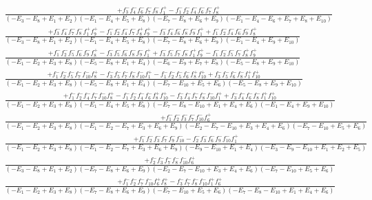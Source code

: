 \documentclass{article}
\begin{document}
\[\begin{array}{rcl}
\frac{+f_{3}^{-}f_{4}^{-}f_{6}^{-}f_{7}^{-}f_{8}^{-}f_{1}^{+}-f_{1}^{-}f_{2}^{-}f_{4}^{-}f_{6}^{-}f_{7}^{-}f_{8}^{+}}{(-E_{3}-E_{8}+E_{1}+E_{2})(-E_{1}-E_{4}+E_{5}+E_{8})(-E_{7}-E_{8}+E_{6}+E_{9})(-E_{1}-E_{4}-E_{6}+E_{7}+E_{8}+E_{10})}\\
\frac{+f_{3}^{-}f_{4}^{-}f_{7}^{-}f_{8}^{-}f_{1}^{+}f_{9}^{+}-f_{1}^{-}f_{2}^{-}f_{4}^{-}f_{7}^{-}f_{8}^{+}f_{9}^{+}-f_{3}^{-}f_{4}^{-}f_{6}^{-}f_{8}^{-}f_{9}^{-}f_{1}^{+}+f_{1}^{-}f_{2}^{-}f_{4}^{-}f_{6}^{-}f_{9}^{-}f_{8}^{+}}{(-E_{3}-E_{8}+E_{1}+E_{2})(-E_{1}-E_{4}+E_{5}+E_{8})(-E_{7}-E_{8}+E_{6}+E_{9})(-E_{1}-E_{4}+E_{9}+E_{10})}\\
\frac{+f_{1}^{-}f_{2}^{-}f_{5}^{-}f_{6}^{-}f_{9}^{-}f_{8}^{+}-f_{3}^{-}f_{5}^{-}f_{6}^{-}f_{8}^{-}f_{9}^{-}f_{1}^{+}+f_{3}^{-}f_{5}^{-}f_{7}^{-}f_{8}^{-}f_{1}^{+}f_{9}^{+}-f_{1}^{-}f_{2}^{-}f_{5}^{-}f_{7}^{-}f_{8}^{+}f_{9}^{+}}{(-E_{1}-E_{2}+E_{3}+E_{8})(-E_{5}-E_{8}+E_{1}+E_{4})(-E_{6}-E_{9}+E_{7}+E_{8})(-E_{5}-E_{8}+E_{9}+E_{10})}\\
\frac{+f_{1}^{-}f_{2}^{-}f_{5}^{-}f_{7}^{-}f_{10}^{-}f_{8}^{+}-f_{3}^{-}f_{5}^{-}f_{7}^{-}f_{8}^{-}f_{10}^{-}f_{1}^{+}-f_{1}^{-}f_{2}^{-}f_{5}^{-}f_{6}^{-}f_{8}^{+}f_{10}^{+}+f_{3}^{-}f_{5}^{-}f_{6}^{-}f_{8}^{-}f_{1}^{+}f_{10}^{+}}{(-E_{1}-E_{2}+E_{3}+E_{8})(-E_{5}-E_{8}+E_{1}+E_{4})(-E_{7}-E_{10}+E_{5}+E_{6})(-E_{5}-E_{8}+E_{9}+E_{10})}\\
\frac{+f_{1}^{-}f_{2}^{-}f_{4}^{-}f_{7}^{-}f_{10}^{-}f_{8}^{+}-f_{1}^{-}f_{2}^{-}f_{4}^{-}f_{6}^{-}f_{8}^{+}f_{10}^{+}-f_{3}^{-}f_{4}^{-}f_{7}^{-}f_{8}^{-}f_{10}^{-}f_{1}^{+}+f_{3}^{-}f_{4}^{-}f_{6}^{-}f_{8}^{-}f_{1}^{+}f_{10}^{+}}{(-E_{1}-E_{2}+E_{3}+E_{8})(-E_{1}-E_{4}+E_{5}+E_{8})(-E_{7}-E_{8}-E_{10}+E_{1}+E_{4}+E_{6})(-E_{1}-E_{4}+E_{9}+E_{10})}\\
\frac{+f_{1}^{-}f_{2}^{-}f_{3}^{-}f_{7}^{-}f_{10}^{-}f_{6}^{+}}{(-E_{1}-E_{2}+E_{3}+E_{8})(-E_{1}-E_{2}-E_{7}+E_{3}+E_{6}+E_{9})(-E_{2}-E_{7}-E_{10}+E_{3}+E_{4}+E_{6})(-E_{7}-E_{10}+E_{5}+E_{6})}\\
\frac{+f_{1}^{-}f_{2}^{-}f_{3}^{-}f_{7}^{-}f_{9}^{-}f_{10}^{-}-f_{2}^{-}f_{3}^{-}f_{6}^{-}f_{9}^{-}f_{10}^{-}f_{1}^{+}}{(-E_{1}-E_{2}+E_{3}+E_{8})(-E_{1}-E_{2}-E_{7}+E_{3}+E_{6}+E_{9})(-E_{9}-E_{10}+E_{1}+E_{4})(-E_{3}-E_{9}-E_{10}+E_{1}+E_{2}+E_{5})}\\
\frac{+f_{2}^{-}f_{3}^{-}f_{7}^{-}f_{8}^{-}f_{10}^{-}f_{6}^{+}}{(-E_{3}-E_{8}+E_{1}+E_{2})(-E_{7}-E_{8}+E_{6}+E_{9})(-E_{2}-E_{7}-E_{10}+E_{3}+E_{4}+E_{6})(-E_{7}-E_{10}+E_{5}+E_{6})}\\
\frac{+f_{1}^{-}f_{2}^{-}f_{7}^{-}f_{10}^{-}f_{6}^{+}f_{8}^{+}-f_{3}^{-}f_{7}^{-}f_{8}^{-}f_{10}^{-}f_{1}^{+}f_{6}^{+}}{(-E_{1}-E_{2}+E_{3}+E_{8})(-E_{7}-E_{8}+E_{6}+E_{9})(-E_{7}-E_{10}+E_{5}+E_{6})(-E_{7}-E_{8}-E_{10}+E_{1}+E_{4}+E_{6})}\\

\end{array}\]
\end{document}
